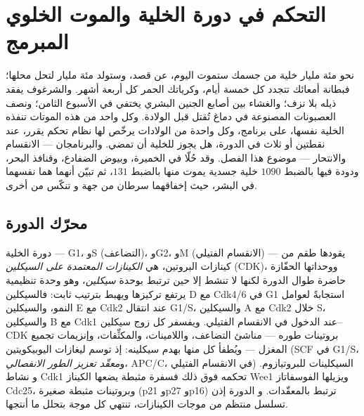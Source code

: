 \chapter{التحكم في دورة الخلية والموت الخلوي المبرمج}\label{ch:b3:cell-cycle-apoptosis}

نحو مئة مليار خلية من جسمك ستموت اليوم، عن قصد،
وستولد مئة مليار لتحل محلها؛ فبطانة
أمعائك تتجدد كل خمسة أيام، وكرياتك الحمر كل أربعة أشهر.
والشرغوف يفقد ذيله بلا نزف؛ والغشاء بين أصابع الجنين
البشري يختفي في الأسبوع الثامن؛ ونصف العصبونات المصنوعة
في دماغ تُقتل قبل الولادة. وكل واحد من هذه الموتات
تنفذه الخلية نفسها، على برنامج، وكل واحدة من
الولادات يرخّص لها نظام تحكم يقرر، عند نقطتين أو ثلاث
في الدورة، هل يجوز للخلية أن تمضي. والبرنامجان
--- الانقسام والانتحار --- موضوع هذا الفصل. وقد
حُلّا في الخميرة، وبيوض الضفادع، وقنافذ البحر، ودودة فيها بالضبط
$1090$ خلية جسدية يموت منها بالضبط $131$، ثم تبيّن أنهما
هما نفسهما في البشر، حيث إخفاقهما سرطان من جهة و
تنكّس من أخرى.

\section{محرّك الدورة}

\begin{definition}\label{def:b3:cell-cycle-apoptosis:cdk}
دورة الخلية --- G1، وS (التضاعف)، وG2، وM (الانقسام الفتيلي) --- يقودها
طقم من كينازات البروتين، هي \emph{الكينازات المعتمدة على السيكلين}
(CDK)، ووحداتها الحفّازة حاضرة طوال الدورة لكنها
لا تنشط إلا حين ترتبط بوحدة \emph{سيكلين}، وهو وحدة تنظيمية يرتفع
تركيزها ويهبط بترتيب ثابت: فالسيكلين D مع Cdk4/6 في
G1 استجابةً لعوامل النمو، والسيكلين E مع Cdk2 عند انتقال
G1/S، والسيكلين A مع Cdk2 خلال S، والسيكلين B مع Cdk1 عند
الدخول في الانقسام الفتيلي. ويفسفر كل زوج سيكلين--CDK بروتينات
طوره --- مناشئ التضاعف، واللامينات، والمكثِّفات، وإنزيمات
تجميع المغزل --- ويُطفأ كل منها بهدم
سيكلينه: إذ توسم ليغازات اليوبيكويتين (SCF في G1/S، و\emph{معقّد
تعزيز الطور الانفصالي}، APC/C، في الانقسام الفتيلي) السيكلينات للبروتيازوم. و
نشاط Cdk1 تحكمه فوق ذلك فسفرة مثبطة يضعها
الكيناز Wee1 ويزيلها الفوسفاتاز Cdc25، وبروتينات
مثبطة صغيرة (p21 وp27 وp16) ترتبط بالمعقّدات. و
الدورة إذن تسلسل منتظم من موجات الكينازات، تنتهي كل موجة
بتحلل ما أنتجها.
\end{definition}

